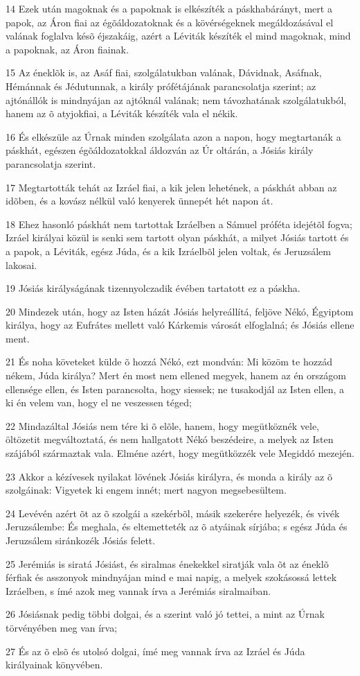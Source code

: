 \par 14 Ezek után magoknak és a papoknak is elkészíték a páskhabárányt, mert a papok, az Áron fiai az égõáldozatoknak és a kövérségeknek megáldozásával el valának foglalva késõ éjszakáig, azért a Léviták készíték el mind magoknak, mind a papoknak, az Áron fiainak.
\par 15 Az éneklõk is, az Asáf fiai, szolgálatukban valának, Dávidnak, Asáfnak, Hémánnak és Jédutunnak, a király prófétájának parancsolatja szerint; az ajtónállók is mindnyájan az ajtóknál valának; nem távozhatának szolgálatukból, hanem az õ atyjokfiai, a Léviták készíték vala el nékik.
\par 16 És elkészüle az Úrnak minden szolgálata azon a napon, hogy megtartanák a páskhát, egészen égõáldozatokkal áldozván az Úr oltárán, a Jósiás király parancsolatja szerint.
\par 17 Megtartották tehát az Izráel fiai, a kik jelen lehetének, a páskhát abban az idõben, és a kovász nélkül való kenyerek ünnepét hét napon át.
\par 18 Ehez hasonló páskhát nem tartottak Izráelben a Sámuel próféta idejétõl fogva; Izráel királyai közül is senki sem tartott olyan páskhát, a milyet Jósiás tartott és a papok, a Léviták, egész Júda, és a kik Izráelbõl jelen voltak, és Jeruzsálem lakosai.
\par 19 Jósiás királyságának tizennyolczadik évében tartatott ez a páskha.
\par 20 Mindezek után, hogy az Isten házát Jósiás helyreállítá, feljöve Nékó, Égyiptom királya, hogy az Eufrátes mellett való Kárkemis városát elfoglalná; és Jósiás ellene ment.
\par 21 És noha követeket külde õ hozzá Nékó, ezt mondván: Mi közöm te hozzád nékem, Júda királya? Mert én most nem ellened megyek, hanem az én országom ellensége ellen, és Isten parancsolta, hogy siessek; ne tusakodjál az Isten ellen, a ki én velem van, hogy el ne veszessen téged;
\par 22 Mindazáltal Jósiás nem tére ki õ elõle, hanem, hogy megütköznék vele, öltözetit megváltoztatá, és nem hallgatott Nékó beszédeire, a melyek az Isten szájából származtak vala. Elméne azért, hogy megütközzék vele Megiddó mezején.
\par 23 Akkor a kézívesek nyilakat lövének Jósiás királyra, és monda a király az õ szolgáinak: Vigyetek ki engem innét; mert nagyon megsebesültem.
\par 24 Levévén azért õt az õ szolgái a szekérbõl, másik szekerére helyezék, és vivék Jeruzsálembe: És meghala, és eltemetteték az õ atyáinak sírjába; s egész Júda és Jeruzsálem siránkozék Jósiás felett.
\par 25 Jerémiás is siratá Jósiást, és siralmas énekekkel siratják vala õt az éneklõ férfiak és asszonyok mindnyájan mind e mai napig, a melyek szokásossá lettek Izráelben, s ímé azok meg vannak írva a Jerémiás siralmaiban.
\par 26 Jósiásnak pedig többi dolgai, és a szerint való jó tettei, a mint az Úrnak törvényében meg van írva;
\par 27 És az õ elsõ és utolsó dolgai, ímé meg vannak írva az Izráel és Júda királyainak könyvében.

